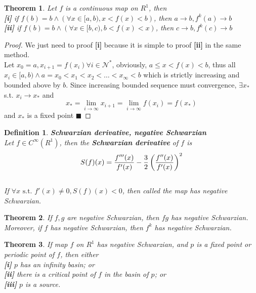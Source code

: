 \documentclass[12pt]{article}
\theoremstyle{plain}
\newtheorem{theorem}{\textbf{Theorem}}[section]
\newtheorem{definition}{\textbf{Definition}}[section]
\newtheorem{proof}{\textit{PROOF}}[section]
\begin{document}
\begin{theorem}\label{basin-theo}Let $f$ is a continuous map on $R^1$, then 
\\\noindent \textbf{[i]} if $f(b) = b \land \left(\forall x \in [a, b), x < f(x) < b\right)$, then $a\rightarrow b, f^k(a) \rightarrow  b$
\\\noindent \textbf{[ii]} if $f(b) = b \land \left(\forall x \in [b, c), b < f(x) < x\right)$, then $c\rightarrow b, f^k(c) \rightarrow  b$
\end{theorem}

{\color{blue}
\begin{proof} We just need to proof \textbf{[i]} because it is simple to proof \textbf{[ii]} in the same method.
\\\noindent Let $x_0 = a, x_{i+1} = f(x_{i}) \forall i \in \mathcal N^*$, obviously, $a \leq x < f(x) < b$, thus all $x_i \in [a, b) \land a = x_0 < x_1 < x_2 < \ldots < x_\infty < b$ which is strictly increasing and bounded above by $b$. Since increasing bounded sequence must convergence, $\exists x_*$ s.t. $x_i \rightarrow x_*$ and 
$$
x_* = \lim_{i \rightarrow \infty}x_{i+1} = \lim_{i \rightarrow \infty}f(x_i) = f(x_*) 
$$
and $x_*$ is a fixed point $\blacksquare$
\end{proof}
}





\begin{definition}\label{Schwarzian-derivative}\textbf{Schwarzian derivative, negative Schwarzian}
\\\noindent Let $f \in C^\infty(R^1)$, then the \textbf{Schwarzian derivative} of $f$ is
$$
S(f)(x) = {f'''(x) \over f'(x)} - {3\over 2}\left({f''(x) \over f'(x)}\right)^2
$$
\\\noindent If $\forall x \text{ s.t. } f'(x) \neq 0, S(f)(x) < 0$, then called the map has negative Schwarzian.
\end{definition}

\begin{theorem}\label{periodic-schwarzian} If $f, g$ are negative Schwarzian, then $fg$ has negative Schwarzian. Moreover, if $f$ has negative Schwarzian, then $f^k$ has negative Schwarzian. 
\end{theorem}

\begin{theorem}\label{schwarzian-theo} If map $f$ on $R^1$ has negative Schwarzian, and $p$ is a fixed point or periodic point of $f$, then either
\\\noindent \textbf{[i]} $p$ has an infinity basin; or
\\\noindent \textbf{[ii]} there is a critical point of $f$ in the basin of $p$; or
\\\noindent \textbf{[iii]} $p$ is a source.
\end{theorem}
\end{document}
